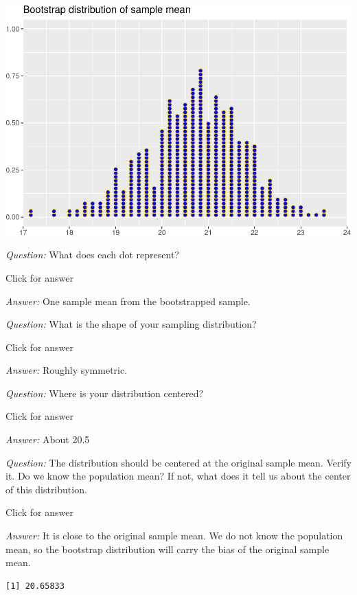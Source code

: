 \documentclass[
]{book}
\newenvironment{Shaded}{\begin{snugshade}}{\end{snugshade}}
\newcommand{\CommentTok}[1]{\textcolor[rgb]{0.56,0.35,0.01}{\textit{#1}}}
\newcommand{\FunctionTok}[1]{\textcolor[rgb]{0.00,0.00,0.00}{#1}}
\newcommand{\NormalTok}[1]{#1}
\newcommand{\SpecialCharTok}[1]{\textcolor[rgb]{0.00,0.00,0.00}{#1}}
\begin{document}
\includegraphics[width=1\linewidth]{Class_Activity_7_files/figure-latex/unnamed-chunk-4-1}

\emph{Question:} What does each dot represent?

Click for answer

\emph{Answer:} One sample mean from the bootstrapped sample.

\emph{Question:} What is the shape of your sampling distribution?

Click for answer

\emph{Answer:} Roughly symmetric.

\emph{Question:} Where is your distribution centered?

Click for answer

\emph{Answer:} About 20.5

\emph{Question:} The distribution should be centered at the original sample mean. Verify it. Do we know the population mean? If not, what does it tell us about the center of this distribution.

Click for answer

\emph{Answer:} It is close to the original sample mean. We do not know the population mean, so the bootstrap distribution will carry the bias of the original sample mean.

\begin{Shaded}
\end{Shaded}

\begin{verbatim}
[1] 20.65833
\end{verbatim}
\end{document}
